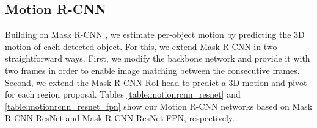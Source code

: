 
\subsection{Motion R-CNN}
\label{ssec:model}

Building on Mask R-CNN \cite{MaskRCNN},
we estimate per-object motion by predicting the 3D motion of each detected object.
For this, we extend Mask R-CNN in two straightforward ways.
First, we modify the backbone network and provide it with two frames
in order to enable image matching between the consecutive frames.
Second, we extend the Mask R-CNN RoI head to predict a 3D motion and pivot for each
region proposal. Tables \ref{table:motionrcnn_resnet} and \ref{table:motionrcnn_resnet_fpn}
show our Motion R-CNN networks based on Mask R-CNN ResNet and Mask R-CNN ResNet-FPN,
respectively.

